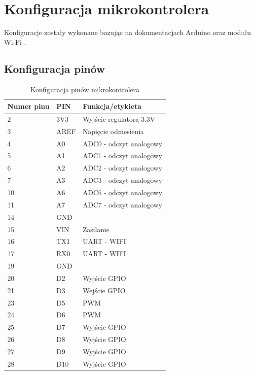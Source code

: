 \documentclass[10pt, a4paper]{article}
\begin{document}
\section{Konfiguracja mikrokontrolera}


Konfiguracje zostały wykonane bazując na dokumentacjach Arduino \cite{dok1} oraz modułu Wi-Fi \cite{dok2}.


\subsection{Konfiguracja pinów}

\begin{table}[H]
	\centering
	\begin{tabular}{|l|l|l|}
		\hline
		Numer pinu	&	PIN & Funkcja/etykieta\\
		\hline
		2&	3V3 & Wyjście regulatora 3.3V\\
		3&	AREF & Napięcie odniesienia\\
		4&	A0 & ADC0 - odczyt analogowy\\
		5&	A1 & ADC1 - odczyt analogowy\\
		6&	A2 & ADC2 - odczyt analogowy\\
		7&	A3 & ADC3 - odczyt analogowy\\
		10&	A6 & ADC6 - odczyt analogowy\\
		11&	A7 & ADC7 - odczyt analogowy \\
		14&	GND&  \\
		15&	VIN&   Zasilanie \\
		16&	TX1&    UART - WIFI\\
		17&	RX0&	UART - WIFI\\
		19&	GND&	\\
		20&	D2& Wyjście GPIO	\\
		21&	D3&	Wejście GPIO\\
		23&	D5&	PWM\\
		24&	D6&	PWM\\
		25&	D7&	Wyjście GPIO\\
		26&	D8&	Wyjście GPIO\\
		27&	D9&	Wyjście GPIO\\
		28&	D10&	Wyjście GPIO\\
	
		\hline
	\end{tabular}
	\caption{Konfiguracja pinów mikrokontrolera}
	
\end{table}
\end{document}
